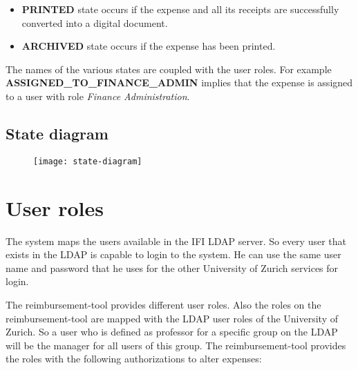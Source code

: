 \begin{itemize}
	\item \textbf{PRINTED} state occurs if the expense and all its receipts are successfully converted into a digital document.
	
	\item \textbf{ARCHIVED} state occurs if the expense has been printed.
\end{itemize}

The names of the various states are coupled with the user roles. For example \textbf{ASSIGNED\_TO\_FINANCE\_ADMIN} implies that the expense is assigned to a user with role \textit{Finance Administration}.
\newpage

\subsection{State diagram}
\label{sec:state-diagram}

\begin{figure}[H]
	{\texttt{[image: state-diagram]}}
\end{figure}
\newpage

\section{User roles}
\label{sec:user-roles}

The system maps the users available in the IFI LDAP server. So every user that exists in the LDAP is capable to login to the system. He can use the same user name and password that he uses for the other University of Zurich services for login. \par

The reimbursement-tool provides different user roles. Also the roles on the reimbursement-tool are mapped with the LDAP user roles of the University of Zurich. So a user who is defined as professor for a specific group on the LDAP will be the manager for all users of this group. The reimbursement-tool provides the roles with the following authorizations to alter expenses:

